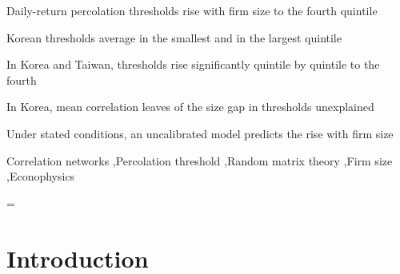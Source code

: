 \documentclass[a4paper,fleqn]{cas-sc}
\begin{document}
\begin{highlights}
\item Daily-return percolation thresholds rise with firm size to the fourth quintile
\item Korean thresholds average \barRhoCQone in the smallest and \barRhoCQfive in the largest quintile
\item In Korea and Taiwan, thresholds rise significantly quintile by quintile to the fourth
\item In Korea, mean correlation leaves \rhoCResidGapPctOfRaw of the size gap in thresholds unexplained
\item Under stated conditions, an uncalibrated model predicts the rise with firm size
\end{highlights}

\begin{keywords}
Correlation networks \sep Percolation threshold \sep Random matrix theory \sep Firm size \sep Econophysics
\end{keywords}

{\hfuzz=\maxdimen \maketitle}

\section{Introduction}\label{sec:introduction}
\end{document}
